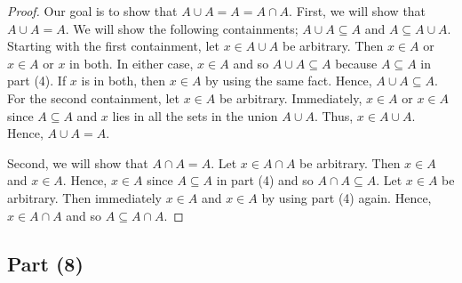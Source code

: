 \documentclass[a4paper]{article}
\begin{document}
\begin{proof}
Our goal is to show that \( A \cup A = A = A \cap A  \). First, we will show that \( A \cup A = A  \). We will show the following containments; \( A \cup A \subseteq A  \) and \( A \subseteq  A \cup A  \). Starting with the first containment, let \( x \in A \cup A  \) be arbitrary. Then \( x \in A  \) or \( x \in A  \) or \( x  \) in both. In either case, \( x \in A  \) and so \( A \cup A \subseteq A  \) because \( A \subseteq  A  \) in part (4). If \( x  \) is in both, then \( x \in A  \) by using the same fact. Hence, \( A \cup A \subseteq  A  \). For the second containment, let \( x \in A  \) be arbitrary. Immediately, \( x \in A  \) or \( x \in A  \) since \( A \subseteq  A  \) and \( x  \) lies in all the sets in the union \( A \cup A  \). Thus, \( x \in A \cup A  \). Hence, \( A \cup A = A  \).   

Second, we will show that \( A \cap A = A  \). Let \( x \in A \cap A  \) be arbitrary. Then \( x \in A  \) and \( x \in A  \). Hence, \( x \in A  \) since \( A \subseteq  A   \) in part (4) and so \( A \cap A \subseteq  A  \). Let \( x \in A  \) be arbitrary. Then immediately \( x \in A  \) and \( x \in A  \) by using part (4) again. Hence, \( x \in A \cap A  \) and so \( A \subseteq A \cap A  \).
\end{proof}

\subsection*{Part (8)}
\end{document}
